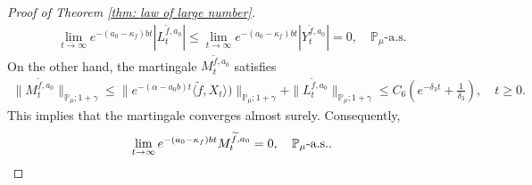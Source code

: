 \documentclass[12pt,a4paper]{amsart}
\theoremstyle{plain}
\theoremstyle{definition}
\numberwithin{equation}{section}
\begin{document}
\begin{proof}[Proof of Theorem \ref{thm: law of large number}]
\begin{align}
  \lim_{t\rightarrow \infty}e^{-(a_0 - \kappa_f)bt}|L_t^{\widetilde{f},a_0}|
  \leq  \lim_{t\rightarrow \infty}e^{-(a_0 - \kappa_f)bt}|Y_t^{\widetilde{f},a_0}|=0, \quad
  \mathbb P_\mu\text{-a.s.}
\end{align}
On the other hand, the martingale $M_t^{\widetilde{f},a_0}$ satisfies
\begin{align}
  \|M_t^{\widetilde{f},a_0}\|_{\mathbb{P}_{\mu};1+\gamma}
  \leq \|e^{-(\alpha-a_0 b)t}\langle \widetilde{f},X_t\rangle)\|_{\mathbb{P}_{\mu};1+\gamma}+\|L_t^{\widetilde{f},a_0}\|_{\mathbb{P}_{\mu};1+\gamma}
  \leq C_6(e^{-\delta_3 t}+\frac{1}{\delta_3}),
  \quad t\geq 0.
\end{align}
This implies that the martingale converges almost surely.
Consequently,
\[
	\lim_{t\rightarrow\infty} e^{-(a_0-\kappa_f)bt}M_t^{\widetilde{f},a_0}
	= 0,
	\quad \mathbb P_\mu\text{-a.s.}.
  \qedhere
\]
\end{proof}
\end{document}
